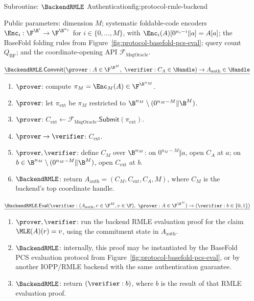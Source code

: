 \begin{protocolbox}{Subroutine: \(\BackendRMLE\) Authentication}{fig:protocol-rmle-backend}
\scriptsize\raggedright
\noindent Public parameters: dimension \(M\); systematic foldable-code encoders
\(\Enc_i:\F^{\B^i}\to\F^{\B^{n_i}}\) for \(i\in\{0,\ldots,M\}\), with
\(\Enc_i(A)[0^{n_i-i}\Vert a]=A[a]\); the BaseFold folding rules from
Figure~\ref{fig:protocol-basefold-pcs-eval}; query count \(Q_{\mathrm{BF}}\);
and the coordinate-opening API \(\mathcal F_{\mathrm{MsgOracle}}\).

\smallskip
\noindent\(\underline{\BackendRMLE.\mathsf{Commit}(\prover:A\in\F^{\B^M},\ \verifier:C_A\in\Handle)\to A_{\mathrm{auth}}\in\Handle}\)

\smallskip
\begin{enumerate}[leftmargin=0.24in,label=\textbf{R\arabic*.},itemsep=0.06em,topsep=0.06em,parsep=0pt]
  \item \(\prover\): compute \(\pi_M=\Enc_M(A)\in\F^{\B^{n_M}}\).
  \item \(\prover\): let \(\pi_{\mathrm{ext}}\) be \(\pi_M\) restricted to
        \(\B^{n_M}\setminus(0^{n_M-M}\Vert\B^M)\).
  \item \(\prover\): \(C_{\mathrm{ext}}\gets
        \mathcal F_{\mathrm{MsgOracle}}.\mathsf{Submit}(\pi_{\mathrm{ext}})\).
  \item \(\prover\to\verifier\): \(C_{\mathrm{ext}}\).
  \item \(\prover,\verifier\): define \(C_M\) over \(\B^{n_M}\): on
        \(0^{n_M-M}\Vert a\), open \(C_A\) at \(a\); on
        \(b\in\B^{n_M}\setminus(0^{n_M-M}\Vert\B^M)\), open
        \(C_{\mathrm{ext}}\) at \(b\).
  \item \(\BackendRMLE\): return
        \(A_{\mathrm{auth}}=(C_M,C_{\mathrm{ext}},C_A,M)\), where \(C_M\) is the
        backend's top coordinate handle.
\end{enumerate}

\smallskip
\noindent\(\underline{\BackendRMLE.\mathsf{Eval}(\verifier:(A_{\mathrm{auth}},r\in\F^M,v\in\F),\ \prover:A\in\F^{\B^M})\to(\verifier:b\in\{0,1\})}\)

\smallskip
\begin{enumerate}[leftmargin=0.24in,label=\textbf{S\arabic*.},itemsep=0.06em,topsep=0.06em,parsep=0pt]
  \item \(\prover,\verifier\): run the backend RMLE evaluation proof for the
        claim \(\MLE(A)(r)=v\), using the commitment state in
        \(A_{\mathrm{auth}}\).
  \item \(\BackendRMLE\): internally, this proof may be instantiated by the
        BaseFold PCS evaluation protocol from
        Figure~\ref{fig:protocol-basefold-pcs-eval}, or by another IOPP/RMLE
        backend with the same authentication guarantee.
  \item \(\BackendRMLE\): return \((\verifier:b)\), where \(b\) is
        the result of that RMLE evaluation proof.
\end{enumerate}
\end{protocolbox}

